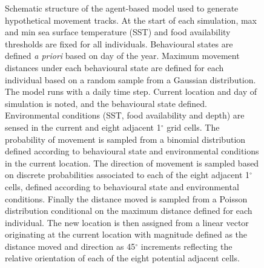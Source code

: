 \documentclass[a4paper,10pt]{article}
\begin{document}
\begin{landscape}
\begin{figure}[!htbp]
  \linespread{0.8}
  \caption{
  Schematic structure of the agent-based model used to generate hypothetical movement tracks. 
  At the start of each simulation, max and min sea surface temperature (SST) and food availability thresholds are fixed for all individuals. Behavioural states are defined \textit{a priori} based on day of the year. Maximum movement distances under each behavioural state are defined for each individual based on a random sample from a Gaussian distribution. The model runs with a daily time step. Current location and day of simulation is noted, and the behavioural state defined. Environmental conditions (SST, food availability and depth) are sensed in the current and eight adjacent 1$^{\circ}$ grid cells. The probability of movement is sampled from a binomial distribution defined according to behavioural state and environmental conditions in the current location. The direction of movement is sampled based on discrete probabilities associated to each of the eight adjacent 1$^{\circ}$ cells, defined according to behavioural state and environmental conditions. Finally the distance moved is sampled from a Poisson distribution conditional on the maximum distance defined for each individual. The new location is then assigned from a linear vector originating at the current location with magnitude defined as the distance moved and direction as 45$^{\circ}$ increments reflecting the relative orientation of each of the eight potential adjacent cells.}
  \label{figs5}
\end{figure}

\newpage


\end{landscape}
\end{document}
